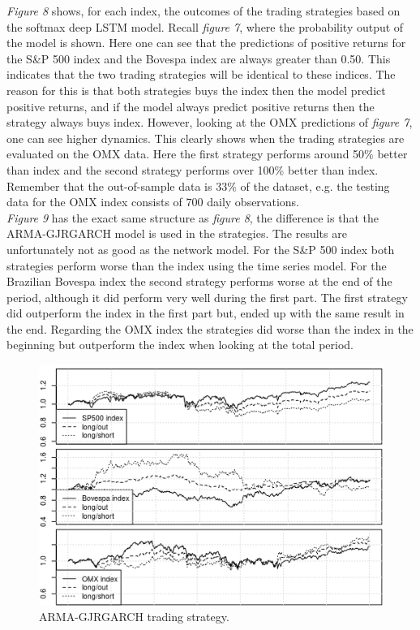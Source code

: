 \documentclass[12pt, letterpaper]{amsart}%
\begin{document}
\textit{Figure 8} shows, for each index, the outcomes of the trading strategies based on the softmax deep LSTM model. Recall \textit{figure 7}, where the probability output of the model is shown. Here one can see that the predictions of positive returns for the S\&P 500 index and the Bovespa index are always greater than 0.50. This indicates that the two trading strategies will be identical to these indices. The reason for this is that both strategies buys the index then the model predict positive returns, and if the model always predict positive returns then the strategy always buys index. However, looking at the OMX predictions of \textit{figure 7}, one can see higher dynamics. This clearly shows when the trading strategies are evaluated on the OMX data. Here the first strategy performs around 50\% better than index and the second strategy performs over 100\% better than index. Remember that the out-of-sample data is $33\%$ of the dataset, e.g. the testing data for the OMX index consists of $700$ daily observations.
\\

\textit{Figure 9} has the exact same structure as \textit{figure 8}, the difference is that the ARMA-GJRGARCH model is used in the strategies. The results are unfortunately not as good as the network model. For the S\&P 500 index both strategies perform worse than the index using the time series model. For the Brazilian Bovespa index the second strategy performs worse at the end of the period, although it did perform very well during the first part. The first strategy did outperform the index in the first part but, ended up with the same result in the end. Regarding the OMX index the strategies did worse than the index in the beginning but outperform the index when looking at the total period.

\begin{figure}[h]%
\caption{ARMA-GJRGARCH trading strategy.}
\centering
\includegraphics[scale=1]{strategyGARCH.png}
\end{figure}
\end{document}
